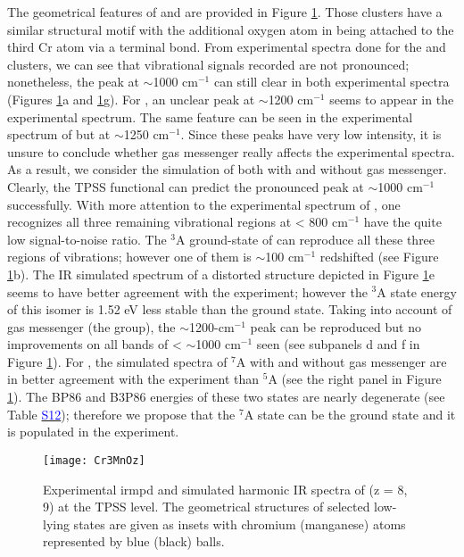 \begin{refsection}
The geometrical features of  and  are provided in Figure \ref{fig:Cr3MnOz}. Those clusters have a similar structural motif with the additional oxygen atom in  being attached to the third Cr atom via a terminal  bond. From experimental spectra done for the  and  clusters, we can see that vibrational signals recorded are not pronounced; nonetheless, the peak at $\sim$1000 cm$^{-1}$ can still clear in both experimental spectra (Figures \ref{fig:Cr3MnOz}a and \ref{fig:Cr3MnOz}g). For , an unclear peak at $\sim$1200 cm$^{-1}$ seems to appear in the experimental spectrum. The same feature can be seen in the experimental spectrum of  but at $\sim$1250 cm$^{-1}$. Since these peaks have very low intensity, it is unsure to conclude whether gas messenger really affects the experimental spectra. As a result, we consider the simulation of both with and without gas messenger. Clearly, the TPSS functional can predict the pronounced peak at $\sim$1000 cm$^{-1}$ successfully. With more attention to the experimental spectrum of , one recognizes all three remaining vibrational regions at < 800 cm$^{-1}$ have the quite low signal-to-noise ratio. The $^3$A ground-state of  can reproduce all these three regions of vibrations; however one of them is $\sim$100 cm$^{-1}$ redshifted (see Figure \ref{fig:Cr3MnOz}b). The IR simulated spectrum of a distorted structure depicted in Figure \ref{fig:Cr3MnOz}e seems to have better agreement with the experiment; however the $^3$A state energy of this isomer is 1.52 eV less stable than the ground state. Taking into account of gas messenger (the  group), the $\sim$1200-cm$^{-1}$ peak can be reproduced but no improvements on all bands of < $\sim$1000 cm$^{-1}$ seen (see subpanels d and f in Figure \ref{fig:Cr3MnOz}). For , the simulated spectra of $^7$A with and without gas messenger are in better agreement with the experiment than $^5$A (see the right panel in Figure \ref{fig:Cr3MnOz}). The BP86 and B3P86 energies of these two states are nearly degenerate (see Table \href{https://github.com/phamlenhan/PhDDissertation/blob/master/Chapter-8SI-Nhan-thesis-CrMnO.pdf}{\textcolor{blue}{S12}}\commenttext{\ref{SI:tbl:Cr3MnO9}}); therefore we propose that the $^7$A state can be the ground state and it is populated in the experiment.  



\begin{figure}[!htb]
	\centering
	\texttt{[image: Cr3MnOz]}
	\caption{Experimental \acrshort{irmpd} and simulated harmonic IR spectra of  (z = 8, 9) at the TPSS level. The geometrical structures of selected low-lying states are given as insets with chromium (manganese) atoms represented by blue (black) balls.}
	\label{fig:Cr3MnOz}
\end{figure}



\end{refsection}
